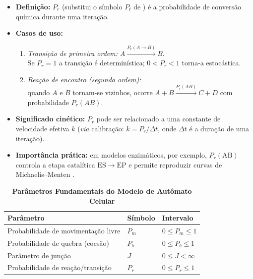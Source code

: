 \documentclass[12pt,oneside]{report}
\begin{document}
\begin{itemize}
    \item \textbf{Definição:} $P_r$ (substitui o símbolo $P_t$ de
          \citeauthor{kier2005}) é a probabilidade de conversão química
          durante uma iteração.
    \item \textbf{Casos de uso:}
          \begin{enumerate}
              \item \emph{Transição de primeira ordem:}
                    $A \xrightarrow{P_r(A\rightarrow B)} B$.\\
                    Se $P_r=1$ a transição é determinística;
                    $0<P_r<1$ torna-a estocástica.
              \item \emph{Reação de encontro (segunda ordem):}\\
                    quando $A$ e $B$ tornam-se vizinhos,
                    ocorre $A+B \xrightarrow{P_r(AB)} C+D$
                    com probabilidade $P_r(AB)$.
          \end{enumerate}
    \item \textbf{Significado cinético:} $P_r$ pode ser relacionado a
          uma constante de velocidade efetiva $k$
          (\textit{via} calibração: $k = P_r/\Delta t$,
          onde $\Delta t$ é a duração de uma iteração).
    \item \textbf{Importância prática:}
          em modelos enzimáticos, por exemplo, $P_r(\mathrm{AB})$
          controla a etapa catalítica $\mathrm{ES}\rightarrow\mathrm{EP}$
          e permite reproduzir curvas de Michaelis–Menten
          \cite[cap.~9]{kier2005}.
\end{itemize}

\begin{table}[H]
    \centering
    \caption{\textbf{Parâmetros Fundamentais do Modelo de Autômato Celular}}
    \vspace{0.2cm}
    \begin{tabularx}{\textwidth}{X m{3cm} m{3cm}}
        \hline
        \textbf{Parâmetro}        & \textbf{Símbolo} & \textbf{Intervalo} \\
        \hline
        Probabilidade de movimentação livre  & $P_m$            & $0 \leq P_m \leq 1$ \\
        Probabilidade de quebra (coesão)  & $P_b$            & $0 \leq P_b \leq 1$ \\
        Parâmetro de junção               & $J$              & $0 \leq J < \infty$ \\
        Probabilidade de reação/transição & $P_r$            & $0 \leq P_r \leq 1$ \\
        \hline
    \end{tabularx}

    \vspace{0.2cm}
\end{table}
\end{document}
